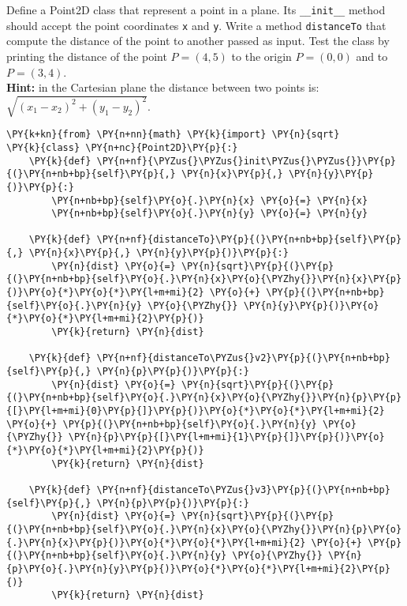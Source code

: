 \begin{Exercise}
Define a Point2D class that represent a point in a plane. Its \texttt{\_\_init\_\_} method should accept the point coordinates \texttt{x} and \texttt{y}. Write a method \texttt{distanceTo} that compute the distance of the point to another passed as input. Test the class by printing the distance of the point \(P=(4, 5)\) to the origin \(P=(0,0)\) and to \(P=(3,4)\). \\
\textbf{Hint:} in the Cartesian plane the distance between two points is: $\sqrt{(x_1 - x_2)^2 + (y_1 - y_2)^2}$.
\end{Exercise}

\begin{Answer}
\begin{tcolorbox}[size=fbox, boxrule=1pt, colback=cellbackground, colframe=cellborder]
\begin{Verbatim}[commandchars=\\\{\}]
\PY{k+kn}{from} \PY{n+nn}{math} \PY{k}{import} \PY{n}{sqrt}
\PY{k}{class} \PY{n+nc}{Point2D}\PY{p}{:}
    \PY{k}{def} \PY{n+nf}{\PYZus{}\PYZus{}init\PYZus{}\PYZus{}}\PY{p}{(}\PY{n+nb+bp}{self}\PY{p}{,} \PY{n}{x}\PY{p}{,} \PY{n}{y}\PY{p}{)}\PY{p}{:}
        \PY{n+nb+bp}{self}\PY{o}{.}\PY{n}{x} \PY{o}{=} \PY{n}{x}
        \PY{n+nb+bp}{self}\PY{o}{.}\PY{n}{y} \PY{o}{=} \PY{n}{y}

    \PY{k}{def} \PY{n+nf}{distanceTo}\PY{p}{(}\PY{n+nb+bp}{self}\PY{p}{,} \PY{n}{x}\PY{p}{,} \PY{n}{y}\PY{p}{)}\PY{p}{:}
        \PY{n}{dist} \PY{o}{=} \PY{n}{sqrt}\PY{p}{(}\PY{p}{(}\PY{n+nb+bp}{self}\PY{o}{.}\PY{n}{x}\PY{o}{\PYZhy{}}\PY{n}{x}\PY{p}{)}\PY{o}{*}\PY{o}{*}\PY{l+m+mi}{2} \PY{o}{+} \PY{p}{(}\PY{n+nb+bp}{self}\PY{o}{.}\PY{n}{y} \PY{o}{\PYZhy{}} \PY{n}{y}\PY{p}{)}\PY{o}{*}\PY{o}{*}\PY{l+m+mi}{2}\PY{p}{)}
        \PY{k}{return} \PY{n}{dist}

    \PY{k}{def} \PY{n+nf}{distanceTo\PYZus{}v2}\PY{p}{(}\PY{n+nb+bp}{self}\PY{p}{,} \PY{n}{p}\PY{p}{)}\PY{p}{:}
        \PY{n}{dist} \PY{o}{=} \PY{n}{sqrt}\PY{p}{(}\PY{p}{(}\PY{n+nb+bp}{self}\PY{o}{.}\PY{n}{x}\PY{o}{\PYZhy{}}\PY{n}{p}\PY{p}{[}\PY{l+m+mi}{0}\PY{p}{]}\PY{p}{)}\PY{o}{*}\PY{o}{*}\PY{l+m+mi}{2} \PY{o}{+} \PY{p}{(}\PY{n+nb+bp}{self}\PY{o}{.}\PY{n}{y} \PY{o}{\PYZhy{}} \PY{n}{p}\PY{p}{[}\PY{l+m+mi}{1}\PY{p}{]}\PY{p}{)}\PY{o}{*}\PY{o}{*}\PY{l+m+mi}{2}\PY{p}{)}
        \PY{k}{return} \PY{n}{dist}

    \PY{k}{def} \PY{n+nf}{distanceTo\PYZus{}v3}\PY{p}{(}\PY{n+nb+bp}{self}\PY{p}{,} \PY{n}{p}\PY{p}{)}\PY{p}{:}
        \PY{n}{dist} \PY{o}{=} \PY{n}{sqrt}\PY{p}{(}\PY{p}{(}\PY{n+nb+bp}{self}\PY{o}{.}\PY{n}{x}\PY{o}{\PYZhy{}}\PY{n}{p}\PY{o}{.}\PY{n}{x}\PY{p}{)}\PY{o}{*}\PY{o}{*}\PY{l+m+mi}{2} \PY{o}{+} \PY{p}{(}\PY{n+nb+bp}{self}\PY{o}{.}\PY{n}{y} \PY{o}{\PYZhy{}} \PY{n}{p}\PY{o}{.}\PY{n}{y}\PY{p}{)}\PY{o}{*}\PY{o}{*}\PY{l+m+mi}{2}\PY{p}{)}
        \PY{k}{return} \PY{n}{dist}


\end{Verbatim}
\end{tcolorbox}
\end{Answer}
